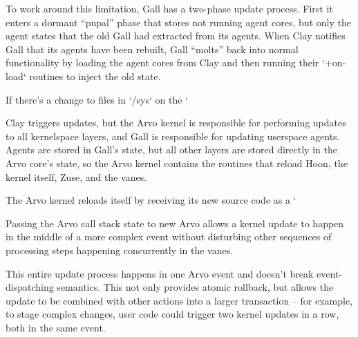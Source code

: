 \documentclass[twoside]{article}
\begin{document}
To work around this limitation, Gall has a two-phase update process. First it enters a dormant “pupal” phase that stores not running agent cores, but only the agent states that the old Gall had extracted from its agents. When Clay notifies Gall that its agents have been rebuilt, Gall “molts” back into normal functionality by loading the agent cores from Clay and then running their `+on-load` routines to inject the old state.

If there's a change to files in `/sys` on the `%

Clay triggers updates, but the Arvo kernel is responsible for performing updates to all kernelspace layers, and Gall is responsible for updating userspace agents. Agents are stored in Gall's state, but all other layers are stored directly in the Arvo core's state, so the Arvo kernel contains the routines that reload Hoon, the kernel itself, Zuse, and the vanes.

The Arvo kernel reloads itself by receiving its new source code as a `%

Passing the Arvo call stack state to new Arvo allows a kernel update to happen in the middle of a more complex event without disturbing other sequences of processing steps happening concurrently in the vanes.

This entire update process happens in one Arvo event and doesn’t break event-dispatching semantics. This not only provides atomic rollback, but allows the update to be combined with other actions into a larger transaction -- for example, to stage complex changes, user code could trigger two kernel updates in a row, both in the same event.
\end{document}
